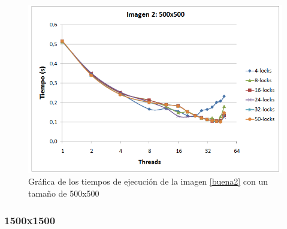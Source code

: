 \begin{figure}[H]
	\captionsetup{justification=centering}
	\centering
	\includegraphics[width=.7\textwidth]{./imagenes/graf2-500}
	\caption{Gr\'{a}fica de los tiempos de ejecuci\'{o}n de la imagen \ref{buena2} con un tama\~{n}o de 500x500}	
	\label{graf2-500}
\end{figure}


\subsubsection{1500x1500}

